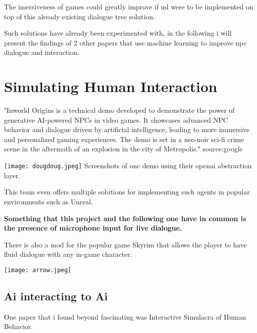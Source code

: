         The imersiveness of games could greatly improve if ml were to be implemented on top of this already existing dialogue tree solution.

        Such solutions have already been experimented with, in the following i will present the findings of 2 other papers that use machine learning to improve npc dialogue and interaction.




      \section*{Simulating Human Interaction}

        "Inworld Origins is a technical demo developed to demonstrate the power of generative AI-powered NPCs in video games. It showcases advanced NPC behavior and dialogue driven by artificial intelligence, leading to more immersive and personalized gaming experiences. The demo is set in a neo-noir sci-fi crime scene in the aftermath of an explosion in the city of Metropolis." source:google

          \texttt{[image: dougdoug.jpeg]}
          Screenshots of one demo using their openai abstraction layer.
          
        This team even offers multiple solutions for implementing such agents in popular environments such as Unreal.

        \textbf{Something that this project and the following one have in common is the presence of microphone input for live dialogue.}

          There is also a mod for the popular game Skyrim that allows the player to have fluid dialogue with any in-game character. 

        \texttt{[image: arrow.jpeg]}



          \subsection*{Ai interacting to Ai}
              One paper that i found beyond fascinating was Interactive Simulacra of Human Behavior.
        
